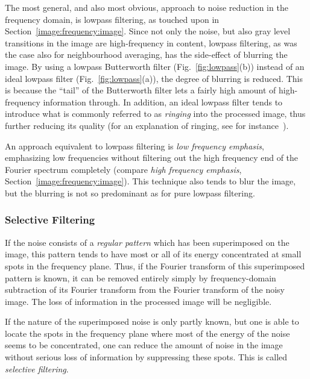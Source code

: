 The most general, and also most obvious, approach to noise reduction
in the frequency domain, is lowpass filtering, as touched upon in
Section~\ref{image:frequency:image}.  Since not only the noise, but
also gray level transitions in the image are high-frequency in
content, lowpass filtering, as was the case also for neighbourhood
averaging, has the side-effect of blurring the image.  By using a
lowpass Butterworth filter (Fig.~\ref{fig:lowpass}(b)) instead of an
ideal lowpass filter (Fig.~\ref{fig:lowpass}(a)), the degree of
blurring is reduced.  This is because the ``tail'' of the Butterworth
filter lets a fairly high amount of high-frequency information
through.  In addition, an ideal lowpass filter tends to introduce what
is commonly referred to as {\em ringing\/} into the processed image,
thus further reducing its quality (for an explanation of ringing, see
for instance~\cite{digim}).

An approach equivalent to lowpass filtering is {\em low frequency
  emphasis\/}, emphasizing low frequencies without filtering out the
high frequency end of the Fourier spectrum completely (compare {\em
  high frequency emphasis\/}, Section~\ref{image:frequency:image}).
This technique also tends to blur the image, but the blurring is not
so predominant as for pure lowpass filtering.

\subsubsection{Selective Filtering}

If the noise consists of a {\em regular pattern\/} which has been
superimposed on the image, this pattern tends to have most or all of
its energy concentrated at small spots in the frequency plane.  Thus,
if the Fourier transform of this superimposed pattern is known, it can
be removed entirely simply by frequency-domain subtraction of its
Fourier transform from the Fourier transform of the noisy image.  The
loss of information in the processed image will be negligible.

If the nature of the superimposed noise is only partly known, but one
is able to locate the spots in the frequency plane where most of the
energy of the noise seems to be concentrated, one can reduce the
amount of noise in the image without serious loss of information by
suppressing these spots.  This is called {\em selective filtering\/}.
